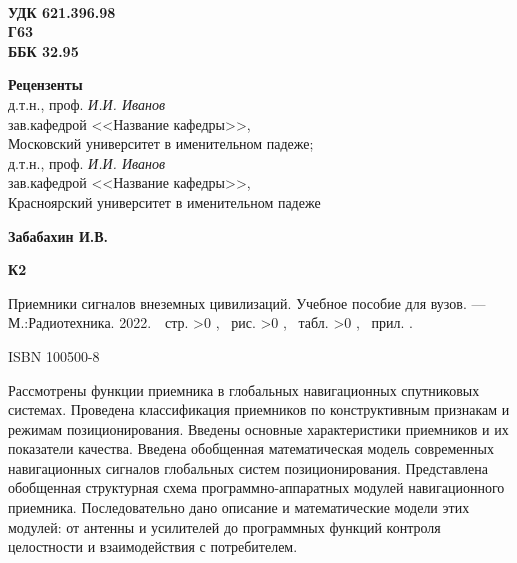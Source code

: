 

\thispagestyle{empty}
\parbox[t]{.45\linewidth}{
  \textbf{ \\
  УДК 621.396.98 \\ %
  Г63 \\
  ББК 32.95
  }
}

\vspace{2ex}
   
\begin{center}
  \textbf{Рецензенты} \\
  д.т.н., проф. \textit{И.И. Иванов} \\
  зав.кафедрой <<Название кафедры>>, \\
  Московский университет в именительном падеже; \\
  д.т.н., проф. \textit{И.И. Иванов} \\
  зав.кафедрой <<Название кафедры>>, \\
  Красноярский университет в именительном падеже
\end{center}

\vspace{2ex}

\noindent
\hfill
\begin{minipage}{0.94\textwidth}
\textbf{Забабахин И.В.}
\end{minipage}

\vspace{1ex}

\noindent
\begin{minipage}[r]{0.06\textwidth}
\textbf{К2}
\end{minipage}
\begin{minipage}{0.94\textwidth}
\hspace{5mm} Приемники сигналов внеземных цивилизаций. Учебное пособие для вузов. --- М.:Радиотехника. 2022.~ 
\pageref{LastPage}\,стр.%
    \ifnum \totfig >0
    , \totfig~рис.%
    \fi
    \ifnum \tottab >0
    , \tottab~табл.%
    \fi
    \ifnum \totapp >0
    , \totapp~прил.%
    \else
    .%
    \fi
\end{minipage}

\vspace{3ex}
\noindent
\hfill
\begin{minipage}{0.94\textwidth}
ISBN 100500-8
\end{minipage}

\vspace{2ex}
\noindent
\hfill
\begin{minipage}{0.94\textwidth}
\small{
Рассмотрены функции приемника в глобальных навигационных спутниковых системах.
Проведена классификация приемников по конструктивным признакам и режимам позиционирования. 
Введены основные характеристики приемников и их показатели качества. 
Введена обобщенная математическая модель современных навигационных сигналов глобальных систем позиционирования. 
Представлена обобщенная структурная схема программно-аппаратных модулей навигационного приемника. 
Последовательно дано описание и математические модели этих модулей: от антенны и усилителей до программных функций контроля целостности и взаимодействия с потребителем. 
}
\end{minipage}

